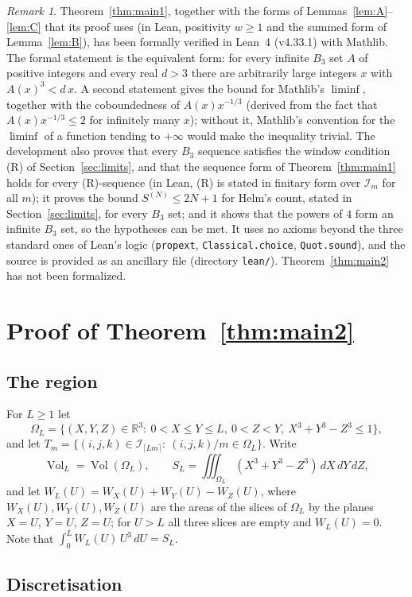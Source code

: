 \documentclass[11pt]{amsart}
\theoremstyle{remark}
\newtheorem{remark}{Remark}
\newcommand{\R}{\mathbb{R}}
\newcommand{\Vol}{\operatorname{Vol}}
\newcommand{\I}{\mathcal{I}}
\begin{document}
\begin{remark}\label{rem:lean}
Theorem~\ref{thm:main1}, together with the forms of Lemmas~\ref{lem:A}--\ref{lem:C} that its proof uses (in Lean, positivity $w\ge1$ and the summed form of Lemma~\ref{lem:B}), has been formally verified in Lean~4 (v4.33.1) with Mathlib. The formal statement is the equivalent form: for every infinite $B_3$ set $A$ of positive integers and every real $d>3$ there are arbitrarily large integers $x$ with $A(x)^3<d\,x$. A second statement gives the bound for Mathlib's $\liminf$, together with the coboundedness of $A(x)x^{-1/3}$ (derived from the fact that $A(x)x^{-1/3}\le2$ for infinitely many $x$); without it, Mathlib's convention for the $\liminf$ of a function tending to $+\infty$ would make the inequality trivial. The development also proves that every $B_3$ sequence satisfies the window condition (R) of Section~\ref{sec:limits}, and that the sequence form of Theorem~\ref{thm:main1} holds for every (R)-sequence (in Lean, (R) is stated in finitary form over $\I_m$ for all $m$); it proves the bound $S^{(N)}\le2N+1$ for Helm's count, stated in Section~\ref{sec:limits}, for every $B_3$ set; and it shows that the powers of $4$ form an infinite $B_3$ set, so the hypotheses can be met. It uses no axioms beyond the three standard ones of Lean's logic (\texttt{propext}, \texttt{Classical.choice}, \texttt{Quot.sound}), and the source is provided as an ancillary file (directory \texttt{lean/}). Theorem~\ref{thm:main2} has not been formalized.
\end{remark}

\section{Proof of Theorem~\ref{thm:main2}}\label{sec:thm2}

\subsection{The region}
For $L\ge1$ let
\[
\Omega_L=\{(X,Y,Z)\in\R^3:\ 0<X\le Y\le L,\ 0<Z<Y,\ X^3+Y^3-Z^3\le1\},
\]
and let $T_m=\{(i,j,k)\in\I_{\lceil Lm\rceil}:\ (i,j,k)/m\in\Omega_L\}$. Write
\[
\Vol_L=\Vol(\Omega_L),\qquad S_L=\iiint_{\Omega_L}(X^3+Y^3-Z^3)\,dX\,dY\,dZ,
\]
and let $W_L(U)=W_X(U)+W_Y(U)-W_Z(U)$, where $W_X(U),W_Y(U),W_Z(U)$ are the areas of the slices of $\Omega_L$ by the planes $X=U$, $Y=U$, $Z=U$; for $U>L$ all three slices are empty and $W_L(U)=0$. Note that $\int_0^L W_L(U)\,U^3\,dU=S_L$.

\subsection{Discretisation}
\end{document}
